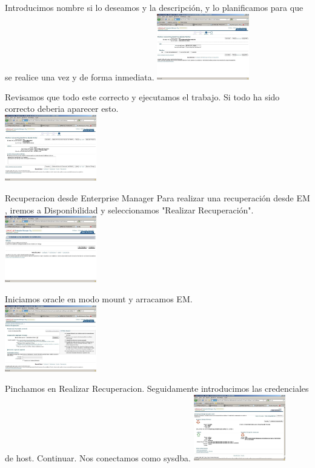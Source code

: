 \documentclass[a4paper,twocolumn,10pt]{article}
\begin{document}
 Introducimos nombre si lo deseamos y la descripci\'on, y lo planificamos para que se realice una vez y de forma inmediata.
\includegraphics[width=0.3\textwidth]{./Imagenes/eje3.jpg}

Revisamos que todo este correcto y ejecutamos el trabajo. Si todo ha sido correcto deberia aparecer esto.\\
\includegraphics[width=0.3\textwidth]{./Imagenes/eje4.jpg}

Recuperacion desde Enterprise Manager
Para realizar una recuperaci\'on desde EM , iremos a Disponibilidad y seleccionamos "Realizar Recuperaci\'on".\\
\includegraphics[width=0.3\textwidth]{./Imagenes/eje5.jpg}

Iniciamos oracle en modo mount y arracamos EM.\\
\includegraphics[width=0.3\textwidth]{./Imagenes/eje6.jpg}

Pinchamos en Realizar Recuperacion. Seguidamente introducimos las credenciales de host. Continuar. Nos conectamos como sysdba.
\includegraphics[width=0.3\textwidth]{./Imagenes/eje7.jpg}
\end{document}
